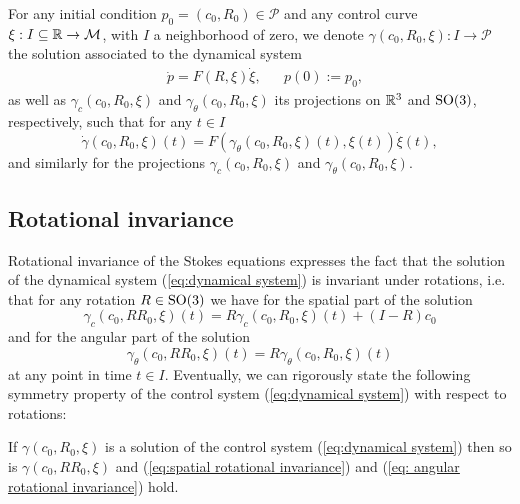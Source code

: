 \label{sec: symmetries}
For any initial condition $p_0 = (c_0, R_0) \in \mathcal{P}$ and any control curve $\xi: I \subseteq \mathbb{R} \to \mathcal{M}$, with $I$ a neighborhood of zero, we denote $\gamma(c_0, R_0, \xi): I \to \mathcal{P}$ the solution associated to the dynamical system
\begin{equation}
\label{eq:dynamical system}
\begin{aligned}
	&\dot{p} = F(R, \xi) \dot{\xi},& & p(0) := p_0,
\end{aligned}
\end{equation}
as well as $\gamma_c(c_0, R_0, \xi)$ and $\gamma_\theta(c_0, R_0, \xi)$ its projections on $\mathbb{R}^3$ and $\operatorname{SO}(3)$, respectively, such that for any $t \in I$
\begin{equation}
	\dot{\gamma}(c_0, R_0, \xi)(t) = F(\gamma_\theta(c_0, R_0, \xi)(t), \xi(t))\dot{\xi}(t),
\end{equation}
and similarly for the projections $\gamma_c(c_0, R_0, \xi)$ and $\gamma_\theta(c_0, R_0, \xi)$.

\subsection{Rotational invariance}
Rotational invariance of the Stokes equations expresses the fact that the solution of the dynamical system (\ref{eq:dynamical system}) is invariant under rotations, i.e. that for any rotation $R \in \operatorname{SO}(3)$ we have for the spatial part of the solution
\begin{equation}
\label{eq:spatial rotational invariance}
	\gamma_c(c_0, R R_0, \xi)(t) = R \gamma_c (c_0, R_0, \xi)(t) + (I - R) c_0
\end{equation}
and for the angular part of the solution
\begin{equation}
\label{eq: angular rotational invariance}
	\gamma_\theta(c_0, R R_0, \xi)(t) =  R \gamma_\theta(c_0, R_0, \xi)(t)
\end{equation}
at any point in time $t \in I$. Eventually, we can rigorously state the following symmetry property of the control system (\ref{eq:dynamical system}) with respect to rotations:

\begin{condition}
\label{cond:rotational invariance}
If $\gamma(c_0, R_0, \xi)$ is a solution of the control system (\ref{eq:dynamical system}) then so is $\gamma(c_0, R R_0, \xi)$ and (\ref{eq:spatial rotational invariance}) and (\ref{eq: angular rotational invariance}) hold.
\end{condition}

